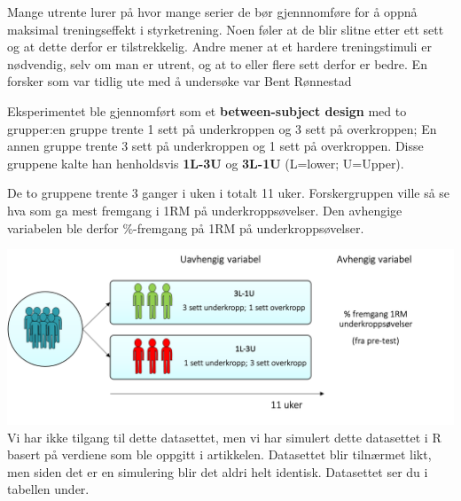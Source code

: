 \documentclass[
]{book}
\begin{document}
Mange utrente lurer på hvor mange serier de bør gjennnomføre for å oppnå maksimal treningseffekt i styrketrening. Noen føler at de blir slitne etter ett sett og at dette derfor er tilstrekkelig. Andre mener at et hardere treningstimuli er nødvendig, selv om man er utrent, og at to eller flere sett derfor er bedre. En forsker som var tidlig ute med å undersøke var Bent Rønnestad \citep{ronnestad_dissimilar_2007}

Eksperimentet ble gjennomført som et \textbf{between-subject design} med to grupper:en gruppe trente 1 sett på underkroppen og 3 sett på overkroppen; En annen gruppe trente 3 sett på underkroppen og 1 sett på overkroppen. Disse gruppene kalte han henholdsvis \textbf{1L-3U} og \textbf{3L-1U} (L=lower; U=Upper).

De to gruppene trente 3 ganger i uken i totalt 11 uker. Forskergruppen ville så se hva som ga mest fremgang i 1RM på underkroppsøvelser. Den avhengige variabelen ble derfor \%-fremgang på 1RM på underkroppsøvelser.

\includegraphics{design.png}
Vi har ikke tilgang til dette datasettet, men vi har simulert dette datasettet i R basert på verdiene som ble oppgitt i artikkelen. Datasettet blir tilnærmet likt, men siden det er en simulering blir det aldri helt identisk. Datasettet ser du i tabellen under.
\end{document}
